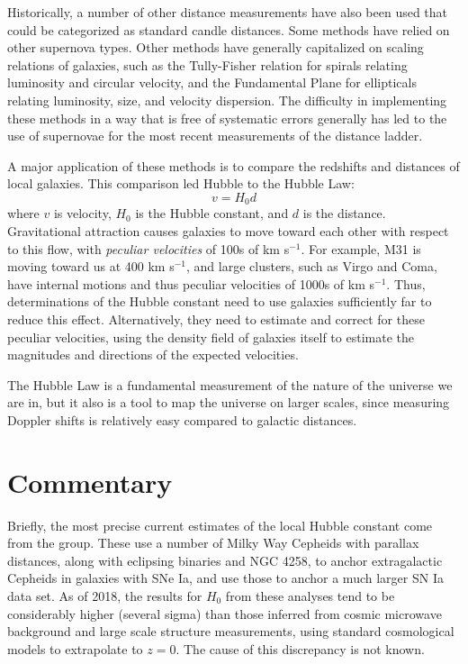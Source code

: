 Historically, a number of other distance measurements have also been
used that could be categorized as standard candle distances. Some
methods have relied on other supernova types. Other methods have
generally capitalized on scaling relations of galaxies, such as the
Tully-Fisher relation for spirals relating luminosity and circular
velocity, and the Fundamental Plane for ellipticals relating
luminosity, size, and velocity dispersion. The difficulty in
implementing these methods in a way that is free of systematic errors
generally has led to the use of supernovae for the most recent
measurements of the distance ladder.

A major application of these methods is to compare the redshifts and
distances of local galaxies. This comparison led Hubble to the Hubble
Law:
\begin{equation}
v = H_0 d
\end{equation}
where $v$ is velocity, $H_0$ is the Hubble constant, and $d$ is the
distance. Gravitational attraction causes galaxies to move toward each
other with respect to this flow, with {\it peculiar velocities} of
100s of km s$^{-1}$. For example, M31 is moving toward us at 400 km
s$^{-1}$, and large clusters, such as Virgo and Coma, have internal
motions and thus peculiar velocities of 1000s of km s$^{-1}$. Thus,
determinations of the Hubble constant need to use galaxies
sufficiently far to reduce this effect. Alternatively, they need to
estimate and correct for these peculiar velocities, using the density
field of galaxies itself to estimate the magnitudes and directions of
the expected velocities.

The Hubble Law is a fundamental measurement of the nature of the
universe we are in, but it also is a tool to map the universe on
larger scales, since measuring Doppler shifts is relatively easy
compared to galactic distances.

\section{Commentary}

Briefly, the most precise current estimates of the local Hubble
constant come from the \citet{riess16a} group. These use a number of
Milky Way Cepheids with parallax distances, along with eclipsing
binaries and NGC 4258, to anchor extragalactic Cepheids in galaxies
with SNe Ia, and use those to anchor a much larger SN Ia data set. As
of 2018, the results for $H_0$ from these analyses tend to be
considerably higher (several sigma) than those inferred from cosmic
microwave background and large scale structure measurements, using
standard cosmological models to extrapolate to $z=0$. The cause of
this discrepancy is not known.

